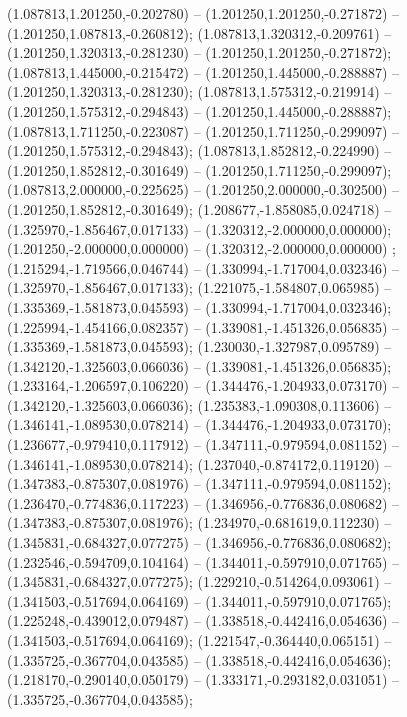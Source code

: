  (1.087813,1.201250,-0.202780) -- (1.201250,1.201250,-0.271872) -- (1.201250,1.087813,-0.260812);
 (1.087813,1.320312,-0.209761) -- (1.201250,1.320313,-0.281230) -- (1.201250,1.201250,-0.271872);
 (1.087813,1.445000,-0.215472) -- (1.201250,1.445000,-0.288887) -- (1.201250,1.320313,-0.281230);
 (1.087813,1.575312,-0.219914) -- (1.201250,1.575312,-0.294843) -- (1.201250,1.445000,-0.288887);
 (1.087813,1.711250,-0.223087) -- (1.201250,1.711250,-0.299097) -- (1.201250,1.575312,-0.294843);
 (1.087813,1.852812,-0.224990) -- (1.201250,1.852812,-0.301649) -- (1.201250,1.711250,-0.299097);
 (1.087813,2.000000,-0.225625) -- (1.201250,2.000000,-0.302500) -- (1.201250,1.852812,-0.301649);
 (1.208677,-1.858085,0.024718) -- (1.325970,-1.856467,0.017133) -- (1.320312,-2.000000,0.000000);
 (1.201250,-2.000000,0.000000) -- (1.320312,-2.000000,0.000000) ;
 (1.215294,-1.719566,0.046744) -- (1.330994,-1.717004,0.032346) -- (1.325970,-1.856467,0.017133);
 (1.221075,-1.584807,0.065985) -- (1.335369,-1.581873,0.045593) -- (1.330994,-1.717004,0.032346);
 (1.225994,-1.454166,0.082357) -- (1.339081,-1.451326,0.056835) -- (1.335369,-1.581873,0.045593);
 (1.230030,-1.327987,0.095789) -- (1.342120,-1.325603,0.066036) -- (1.339081,-1.451326,0.056835);
 (1.233164,-1.206597,0.106220) -- (1.344476,-1.204933,0.073170) -- (1.342120,-1.325603,0.066036);
 (1.235383,-1.090308,0.113606) -- (1.346141,-1.089530,0.078214) -- (1.344476,-1.204933,0.073170);
 (1.236677,-0.979410,0.117912) -- (1.347111,-0.979594,0.081152) -- (1.346141,-1.089530,0.078214);
 (1.237040,-0.874172,0.119120) -- (1.347383,-0.875307,0.081976) -- (1.347111,-0.979594,0.081152);
 (1.236470,-0.774836,0.117223) -- (1.346956,-0.776836,0.080682) -- (1.347383,-0.875307,0.081976);
 (1.234970,-0.681619,0.112230) -- (1.345831,-0.684327,0.077275) -- (1.346956,-0.776836,0.080682);
 (1.232546,-0.594709,0.104164) -- (1.344011,-0.597910,0.071765) -- (1.345831,-0.684327,0.077275);
 (1.229210,-0.514264,0.093061) -- (1.341503,-0.517694,0.064169) -- (1.344011,-0.597910,0.071765);
 (1.225248,-0.439012,0.079487) -- (1.338518,-0.442416,0.054636) -- (1.341503,-0.517694,0.064169);
 (1.221547,-0.364440,0.065151) -- (1.335725,-0.367704,0.043585) -- (1.338518,-0.442416,0.054636);
 (1.218170,-0.290140,0.050179) -- (1.333171,-0.293182,0.031051) -- (1.335725,-0.367704,0.043585);
